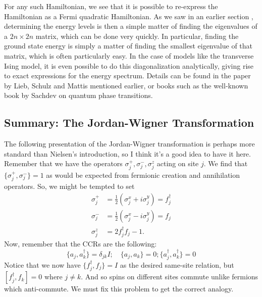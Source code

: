 \documentclass{book}
\theoremstyle{definition}
\begin{document}
For any such Hamiltonian, we see that it is possible to re-express the Hamiltonian as a Fermi quadratic Hamiltonian. As we saw in an earlier section , determining the energy levels is then a simple matter of finding the eigenvalues of a $2n \times  2n$ matrix, which can be done very
quickly. In particular, finding the ground state energy is simply a matter of finding the smallest eigenvalue of that matrix, which is often particularly easy. In the case of models like the transverse Ising model, it is even possible
to do this diagonalization analytically, giving rise to exact expressions for the energy spectrum. Details can be found in the paper by Lieb, Schulz and Mattis mentioned earlier, or books such as the well-known book by Sachdev on quantum phase transitions.









\subsection{Summary: The Jordan-Wigner Transformation}

The following presentation of the Jordan-Wigner transformation is perhaps more standard than Nielsen's introduction, so I think it's a good idea to have it here. \\

Remember that we have the operators $\sigma_j^+,\sigma_j^-,\sigma^z_j$ acting on site $j$. We find that $\{ \sigma_j^+, \sigma_j^- \} = 1$ as would be expected from fermionic creation and annihilation operators. So, we might be tempted to set
\begin{align}
\sigma_j^+ &= \frac{1}{2}(\sigma_j^x + i\sigma^y_j) = f_j^\dagger\\
\sigma_j^- &= \frac{1}{2}(\sigma_j^x - i\sigma^y_j) = f_j\\
\sigma_j^z &= 2f_j^\dagger f_j - 1.
\end{align}
Now, remember that the CCRs are the following:
\begin{equation}
\boxed{\{ a_j , a_k^\dagger \} = \delta_{jk} I; \quad \{ a_j ,a_k \} = 0; \{ a_j^\dagger, a_k^\dagger \} = 0}
\end{equation} 
Notice that we now have $\{ f_j^\dagger,f_j\} =I$ as the desired same-site relation, but $[ f_j^\dagger,f_k] = 0$ where $j\neq k$. And so spins on different sites commute unlike fermions which anti-commute. We must fix this problem to get the correct analogy.\\
\end{document}

